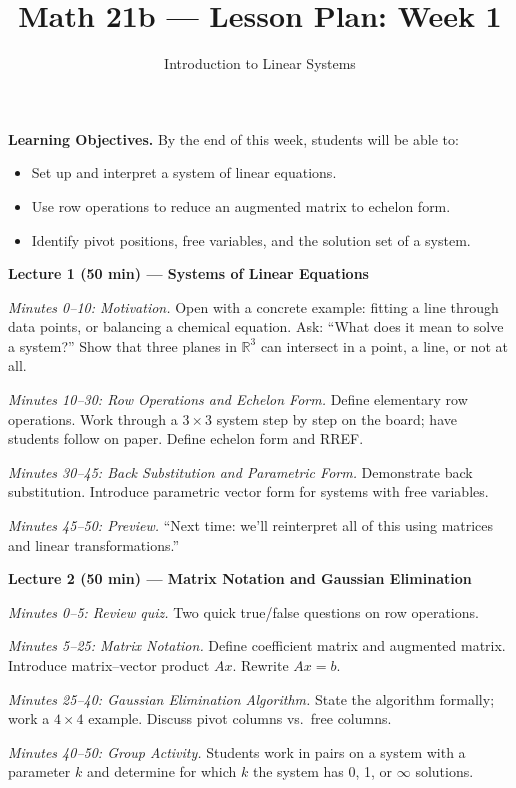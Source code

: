 \documentclass{amsart}
\title{Math 21b --- Lesson Plan: Week 1}
\subtitle{Introduction to Linear Systems}
\date{}
\begin{document}
\maketitle

\textbf{Learning Objectives.} By the end of this week, students will be able to:
\begin{itemize}
    \item Set up and interpret a system of linear equations.
    \item Use row operations to reduce an augmented matrix to echelon form.
    \item Identify pivot positions, free variables, and the solution set of a system.
\end{itemize}

\bigskip

\textbf{Lecture 1 (50 min) --- Systems of Linear Equations}

\textit{Minutes 0--10: Motivation.} Open with a concrete example: fitting a line through data points, or balancing a chemical equation. Ask: ``What does it mean to solve a system?'' Show that three planes in $\mathbb{R}^3$ can intersect in a point, a line, or not at all.

\textit{Minutes 10--30: Row Operations and Echelon Form.} Define elementary row operations. Work through a $3\times 3$ system step by step on the board; have students follow on paper. Define echelon form and RREF.

\textit{Minutes 30--45: Back Substitution and Parametric Form.} Demonstrate back substitution. Introduce parametric vector form for systems with free variables.

\textit{Minutes 45--50: Preview.} ``Next time: we'll reinterpret all of this using matrices and linear transformations.''

\bigskip

\textbf{Lecture 2 (50 min) --- Matrix Notation and Gaussian Elimination}

\textit{Minutes 0--5: Review quiz.} Two quick true/false questions on row operations.

\textit{Minutes 5--25: Matrix Notation.} Define coefficient matrix and augmented matrix. Introduce matrix--vector product $Ax$. Rewrite $Ax = b$.

\textit{Minutes 25--40: Gaussian Elimination Algorithm.} State the algorithm formally; work a $4\times 4$ example. Discuss pivot columns vs.\ free columns.

\textit{Minutes 40--50: Group Activity.} Students work in pairs on a system with a parameter $k$ and determine for which $k$ the system has 0, 1, or $\infty$ solutions.
\end{document}

